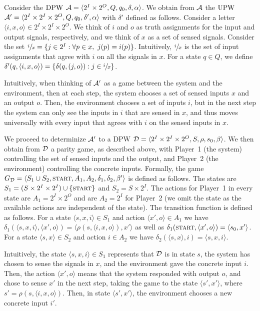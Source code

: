 \documentclass[runningheads,a4paper]{llncs}
\newcommand{\set}[1]{{\{#1\}}}
\newcommand{\zug}[1]{\langle #1  \rangle}
\newcommand{\DPW}{\mbox{\rm DPW}\xspace}
\newcommand{\UPW}{\mbox{\rm UPW}\xspace}
\newcommand{\A}{{\cal A}}
\newcommand{\D}{{\cal D}}
\newcommand{\tIN}{{2^I}}
\newcommand{\tOUT}{{2^O}}
\newcommand{\Act}{A}
\newcommand{\start}{{\textsc{start}}}
\begin{document}
Consider the $\DPW$ $\A=\zug{\tIN\times \tOUT,Q,q_0,\delta,\alpha}$. We obtain from $\A$ the $\UPW$ $\A'=\zug{\tIN\times \tIN\times \tOUT,Q,q_0,\delta',\alpha}$ with $\delta'$ defined as follows. Consider a letter $\zug{i,x,o}\in \tIN\times \tIN\times \tOUT$. We think of $i$ and $o$ as truth assignments for the input and output signals, respectively, and we think of $x$ as a set of sensed signals. Consider the set $\sfrac{i}{x}=\set{j\in \tIN: \forall p\in x,\ j(p)=i(p)}$. Intuitively, $\sfrac{i}{x}$ is the set of input assignments that agree with $i$ on all the signals in $x$. For a state $q\in Q$, we define $\delta'(q, \zug{i,x,o})=\set{\delta(q,(j,o)): j\in \sfrac{i}{x}}$. 

Intuitively, when thinking of $\A'$ as a game between the system and the environment, then at each step, the system chooses a set of sensed inputs $x$ and an output $o$. Then, the environment chooses a set of inputs $i$, but in the next step the system can only see the inputs in $i$ that are sensed in $x$, and thus moves universally with every input that agrees with $i$ on the sensed inputs in $x$.

We proceed to determinize $\A'$ to a DPW $\D=\zug{\tIN\times \tIN\times \tOUT,S,\rho,s_0,\beta}$. We then obtain from $\D$ a parity game, as described above, with Player~1 (the system) controlling the set of sensed inputs and the output, and Player~2 (the environment) controlling the concrete inputs. Formally, the game 
$G_\D=\zug{S_1\cup S_2,\start,\Act_1,\Act_2,\delta_1, \delta_2,\beta'}$ is defined as follows. The states are $S_1=(S\times \tIN\times \tIN)\cup \set{\start}$ and $S_2=S\times \tIN$. The actions for Player~1 in every state are $\Act_1=\tIN\times \tOUT$ and are $\Act_2=\tIN$ for Player~2 (we omit the state as the available actions are independent of the state). The transition function is defined as follows. For a state $\zug{s,x,i}\in S_1$ and action $\zug{x',o}\in A_1$ we have $\delta_1(\zug{s,x,i},\zug{x',o})=\zug{\rho(s,\zug{i,x,o}),x'}$ as well as $\delta_1(\start,\zug{x',o})=\zug{s_0,x'}$. 
For a state $\zug{s,x}\in S_2$ and action $i\in A_2$ we have $\delta_2(\zug{s,x},i)=\zug{s,x,i}$. 

Intuitively, the state $\zug{s,x,i}\in S_1$ represents that $\D$ is in state $s$, the system has chosen to sense the signals in $x$, and the environment gave the concrete input $i$. Then, the action $\zug{x',o}$ means that the system responded with output $o$, and chose to sense $x'$ in the next step, taking the game to the state $\zug{s',x'}$, where $s'=\rho(s,\zug{i,x,o})$. Then, in state $\zug{s',x'}$, the environment chooses a new concrete input $i'$.
\end{document}
